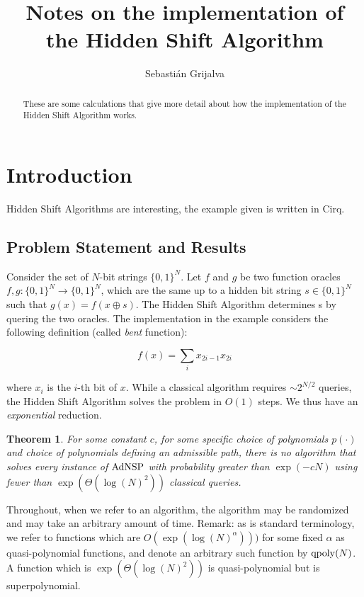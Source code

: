 \documentclass[letterpaper,onecolumn]{quantumarticle}
\newtheorem{theorem}{Theorem}
\newcommand{\be}{\begin{equation}}
\newcommand{\ee}{\end{equation}}
\newcommand{\qpoly}{{\rm qpoly}}
\newcommand{\Ocl}{{\rm AdNSP}}
\begin{document}
\title{Notes on the implementation of the Hidden Shift Algorithm}

\author{Sebastián Grijalva}

\begin{abstract}
These are some calculations that give more detail about how the implementation of the Hidden Shift Algorithm works.
\end{abstract}
\maketitle

\section{Introduction}

Hidden Shift Algorithms are interesting, the example given is written in \textsf{Cirq}.


\subsection{Problem Statement and Results}

Consider the set of $N$-bit strings $\{0,1\}^N$. Let $f$ and $g$ be two function oracles $f,g : \{0,1\}^N \to \{0,1\}^N$, which are the same up to a hidden bit string $s \in \{0,1\}^N$ such that $g(x) = f(x \oplus s)$. The Hidden Shift Algorithm determines s by quering the two oracles. The 
implementation in the example considers the following definition (called \emph{bent} function):

\be 
\label{oracle}
f(x) = \sum_i x_{2i-1} x_{2i}
\ee

where $x_i$ is the $i$-th bit of $x$. While a classical algorithm requires $\sim 2^{N/2}$ queries, the Hidden Shift 
Algorithm solves the problem in $O(1)$ steps. We thus have an \emph{exponential}
reduction.

\begin{theorem}
\label{mainth}
For some constant $c$, for some specific choice of polynomials $p(\cdot)$ and choice of polynomials defining an admissible path, there is no algorithm that solves every instance of $\Ocl$ with probability greater than $\exp(-cN)$ using
fewer than $\exp(\Theta(\log(N)^2))$ classical queries.
\end{theorem}
Throughout, when we refer to an algorithm, the algorithm may be randomized and may take an arbitrary amount of time.
Remark: as is standard terminology, we refer to functions which are $O(\exp(\log(N)^\alpha)))$ for some fixed $\alpha$ as quasi-polynomial functions, and denote an arbitrary such function by $\qpoly(N)$.  A function which is 
$\exp(\Theta(\log(N)^2))$ is quasi-polynomial but is superpolynomial.
\end{document}
